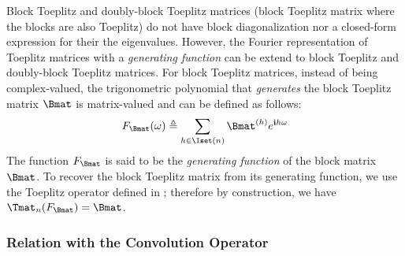 \noindent
Block Toeplitz and doubly-block Toeplitz matrices (block Toeplitz matrix where the blocks are also Toeplitz) do not have block diagonalization nor a closed-form expression for their the eigenvalues.
However, the Fourier representation of Toeplitz matrices with a \emph{generating function} can be extend to block Toeplitz and doubly-block Toeplitz matrices.
For block Toeplitz matrices, instead of being complex-valued, the trigonometric polynomial that \emph{generates} the block Toeplitz matrix $\Bmat$ is matrix-valued and can be defined as follows:
\begin{equation}
  F_{\Bmat}(\omega) \triangleq \sum_{h \in \Iset(n)} \Bmat^{(h)} e^{\ci h \omega}
\end{equation}
The function $F_{\Bmat}$ is said to be the \emph{generating function} of the block matrix $\Bmat$.
To recover the block Toeplitz matrix from its generating function, we use the Toeplitz operator defined in ; therefore by construction, we have $\Tmat_n(F_\Bmat) = \Bmat$.







\vspace{1.50cm}
\pagebreak

\subsubsection{Relation with the Convolution Operator}
\label{subsubsection:ch2-relation_with_the_convolution_operator}

